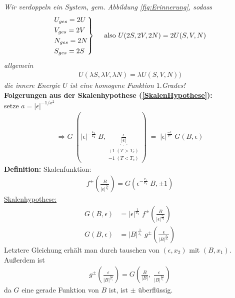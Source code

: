 \documentclass[12pt]{article}
\begin{document}
\textit{Wir verdoppeln ein System, gem. Abbildung \ref{fig:Erinnerung},  sodass 
\begin{align*}
\begin{rcases}
U_{ges}= 2U \\
V_{ges} = 2V \\
N_{ges} = 2N \\
S_{ges} = 2S 
\end{rcases}
\quad  \mbox{ also } U(2S, 2V, 2N) = 2 U (S,V,N)
\end{align*}
allgemein
\begin{align*}
U( \lambda S, \lambda V, \lambda N) = \lambda U(S,V,N))
\end{align*}
die innere Energie $U$ ist eine homogene Funktion $1.$Grades!} \\

\textbf{Folgerungen aus der Skalenhypothese (\ref{SkalenHypothese}):} \\
setze $ a= \vert \epsilon \vert ^{-1/x^2}$
\begin{align}
\Rightarrow G\; (\vert \epsilon \vert ^{-\frac{x_1}{x_2}} \;  B, \underbrace{ \frac{\epsilon}{\vert \epsilon \vert}}_{\substack{ +1 \; (T>T_c) \\ -1 \; (T<T_c)}} ) \; = \; \vert \epsilon \vert^\frac{-1}{x^2} \; G(B, \epsilon)
\end{align}
\textbf{Definition:} Skalenfunktion: 
\begin{align}
f^\pm \left( \frac{B}{\vert \epsilon \vert ^\frac{x_1}{x_2}} \right) = G \left( \epsilon^{-\frac{x_1}{x_2}} \; B, \pm 1 \right)
\end{align} 
\underline{Skalenhypothese:}
\begin{align}
G(B,\epsilon) &= \vert \epsilon \vert ^\frac{1}{x_2} \; f^\pm \left( \frac{B}{\vert \epsilon \vert ^\frac{x_1}{x_2}} \right) \\
G(B,\epsilon) &= \vert B \vert ^\frac{1}{x_1} \; g^\pm \left( \frac{\epsilon}{\vert B \vert ^\frac{x_2}{x_1}} \right)
\end{align}
Letztere Gleichung erhält man durch tauschen von $(\epsilon, x_2)$ mit $(B,x_1)$. Außerdem ist
\begin{align*}
g^\pm \left( \frac{\epsilon}{\vert B \vert ^\frac{x_2}{x_1}} \right) = G\left( \frac{B}{\vert B \vert }, \; \frac{\epsilon}{\vert B \vert^\frac{x_2}{x_1}}\right)
\end{align*}
da $G$ eine gerade Funktion von $B$ ist, ist $\pm$ überflüssig.\\
\end{document}
